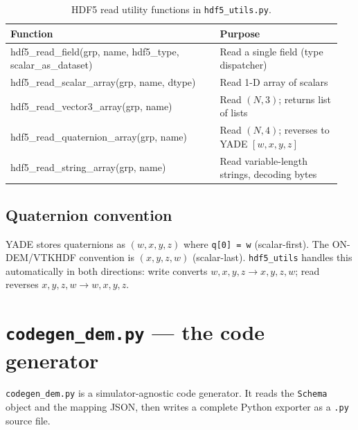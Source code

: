 \documentclass[11pt,a4paper]{article}
\begin{document}
\begin{table}[htbp]
\centering
\begin{tabularx}{\textwidth}{>{\ttfamily\small\raggedright\arraybackslash}p{0.60\linewidth}>{\small\raggedright\arraybackslash}p{0.35\linewidth}}
\toprule
\sffamily\textbf{Function} & \sffamily\textbf{Purpose} \\
\midrule
hdf5\_read\_field(grp, name, hdf5\_type, scalar\_as\_dataset) &
  Read a single field (type dispatcher) \\
hdf5\_read\_scalar\_array(grp, name, dtype) &
  Read 1-D array of scalars \\
hdf5\_read\_vector3\_array(grp, name) &
  Read $(N,3)$; returns list of lists \\
hdf5\_read\_quaternion\_array(grp, name) &
  Read $(N,4)$; reverses to YADE $[w,x,y,z]$ \\
hdf5\_read\_string\_array(grp, name) &
  Read variable-length strings, decoding bytes \\
\bottomrule
\end{tabularx}
\caption{HDF5 read utility functions in \texttt{hdf5\_utils.py}.}
\end{table}

\subsection{Quaternion convention}

\begin{warnbox}
YADE stores quaternions as $(w, x, y, z)$ where \texttt{q[0] = w}
(scalar-first). The ON-DEM/VTKHDF convention is $(x, y, z, w)$
(scalar-last). \texttt{hdf5\_utils} handles this automatically in both
directions: write converts $w,x,y,z \to x,y,z,w$; read reverses $x,y,z,w
\to w,x,y,z$.
\end{warnbox}

\section{\texttt{codegen\_dem.py} --- the code generator}
\label{sec:codegen}

\texttt{codegen\_dem.py} is a simulator-agnostic code generator. It reads
the \texttt{Schema} object and the mapping JSON, then writes a complete
Python exporter as a \texttt{.py} source file.
\end{document}

